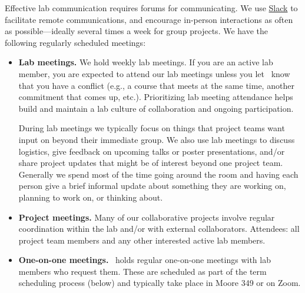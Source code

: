 \documentclass{tufte-book} %
\begin{document}

\noindent Effective lab communication requires forums for communicating.  We use \href{http://www.slack.com}{Slack} to
facilitate remote communications, and encourage
in-person interactions as often as possible---ideally several times a
week for group projects.  We have the following regularly scheduled
meetings:


\begin{itemize}
  \item \textbf{Lab meetings.} We hold weekly lab meetings.
If you are an active lab member, you are expected to
attend our lab meetings unless you let \director~know that you have a conflict
(e.g., a course that meets at the same time, another commitment that comes up,
etc.). Prioritizing lab meeting attendance helps build and maintain a lab culture
of collaboration and ongoing participation.

During lab meetings we typically focus on things that project teams want input
on beyond their immediate group. We also use lab meetings to discuss logistics,
give feedback on upcoming talks or poster presentations, and/or share project
updates that might be of interest beyond one project team. Generally we spend
most of the time going around the room and having each person give a brief
informal update about something they are working on, planning to work on, or
thinking about.

\item \textbf{Project meetings.}  Many of our collaborative
  projects involve regular coordination within the lab and/or with external collaborators.
  Attendees: all project team members and any other interested active
  lab members.

  \item \textbf{One-on-one meetings.} \director~holds regular
  one-on-one meetings with lab members who request them.  These
  are scheduled as part of the term scheduling process (below)
  and typically take place in Moore 349 or on Zoom.


\end{itemize}
\end{document}
